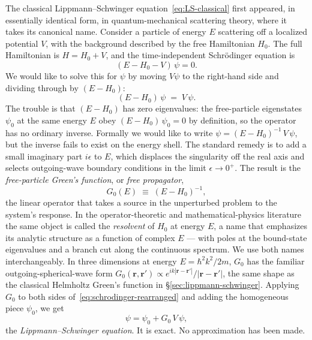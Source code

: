 \documentclass[11pt]{article}
\begin{document}
The classical Lippmann--Schwinger
equation~\eqref{eq:LS-classical} first appeared, in essentially
identical form, in quantum-mechanical scattering theory, where it
takes its canonical name.  Consider a particle of energy $E$
scattering off a localized potential $V$, with the background
described by the free Hamiltonian $H_0$.  The full Hamiltonian is
$H = H_0 + V$, and the time-independent Schr\"odinger equation is
\begin{equation}
(E - H_0 - V)\,\psi = 0 .
\label{eq:schrodinger}
\end{equation}
We would like to solve this for $\psi$ by moving $V\psi$ to the
right-hand side and dividing through by $(E - H_0)$:
\begin{equation}
(E - H_0)\,\psi \;=\; V\,\psi .
\label{eq:schrodinger-rearranged}
\end{equation}
The trouble is that $(E - H_0)$ has zero eigenvalues: the
free-particle eigenstates $\psi_0$ at the same energy $E$ obey
$(E - H_0)\,\psi_0 = 0$ by definition, so the operator has no
ordinary inverse.  Formally we would like to write $\psi = (E -
H_0)^{-1}\,V\,\psi$, but the inverse fails to exist on the energy
shell.  The standard remedy is to add a small imaginary part
$i\epsilon$ to $E$, which displaces the singularity off the real
axis and selects outgoing-wave boundary conditions in the limit
$\epsilon \to 0^+$.  The result is the \emph{free-particle Green's
function}, or \emph{free propagator},
\begin{equation}
G_0(E) \;\equiv\; (E - H_0)^{-1},
\label{eq:G0}
\end{equation}
the linear operator that takes a source in the unperturbed problem
to the system's response.  In the operator-theoretic and
mathematical-physics literature the same object is called the
\emph{resolvent} of $H_0$ at energy $E$, a name that emphasizes its
analytic structure as a function of complex $E$ --- with poles at
the bound-state eigenvalues and a branch cut along the continuous
spectrum.  We use both names interchangeably.  In three dimensions
at energy $E = \hbar^2 k^2 / 2m$, $G_0$ has the familiar
outgoing-spherical-wave form $G_0(\mathbf{r}, \mathbf{r}')
\propto e^{ik|\mathbf{r}-\mathbf{r}'|}/|\mathbf{r}-\mathbf{r}'|$,
the same shape as the classical Helmholtz Green's function in
\S\ref{sec:lippmann-schwinger}.  Applying $G_0$ to both sides
of~\eqref{eq:schrodinger-rearranged} and adding the homogeneous
piece $\psi_0$, we get
\begin{equation}
\boxed{\;\psi = \psi_0 + G_0\,V\,\psi ,\;}
\label{eq:LS}
\end{equation}
the \emph{Lippmann--Schwinger equation}.  It is exact.  No
approximation has been made.
\end{document}
